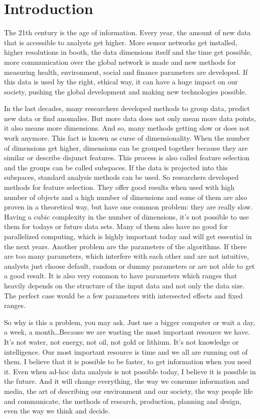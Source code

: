 \chapter{Introduction}\label{chap:introduction}
The 21th century is the age of information. Every year, the amount of new data that is accessible to analysts get higher. More sensor networks get installed, higher resolutions in booth, the data dimensions itself and the time get possible, more communication over the global network is made and new methods for measuring health, environment, social and finance parameters are developed. If this data is used by the right, ethical way, it can have a huge impact on our society, pushing the global development and making new technologies possible. 

In the last decades, many researchers developed methods to group data, predict new data or find anomalies. But more data does not only mean more data points, it also means more dimensions. And so, many methods getting slow or does not work anymore. This fact is known as curse of dimensionality. When the number of dimensions get higher, dimensions can be grouped together because they are similar or describe disjunct features. This process is also called feature selection and the groups can be called subspaces. If the data is projected into this subspaces, standard analysis methods can be used. So researchers developed methods for feature selection. They offer good results when used with high number of objects and a high number of dimensions and some of them are also proven in a theoretical way, but have one common problem: they are really slow. Having a cubic complexity in the number of dimensions, it's not possible to use them for todays or future data sets. Many of them also have no good for parallelized computing, which is highly important today and will get essential in the next years. Another problem are the parameters of the algorithms. If there are too many parameters, which interfere with each other and are not intuitive, analysts just choose default, random or dummy parameters or are not able to get a good result. It is also very common to have parameters which ranges that heavily depends on the structure of the input data and not only the data size. The perfect case would be a few parameters with intersected effects and fixed ranges.

So why is this a problem, you may ask. Just use a bigger computer or wait a day, a week, a month\ldots Because we are wasting the most important resource we have. It's not water, not energy, not oil, not gold or lithium. It's not knowledge or intelligence. Our most important resource is time and we all are running out of them. I believe that it is possible to be faster, to get information when you need it. Even when ad-hoc data analysis is not possible today, I believe it is possible in the future. And it will change everything, the way we consume information and media, the art of describing our environment and our society, the way people life and communicate, the methods of research, production, planning and design, even the way we think and decide.


